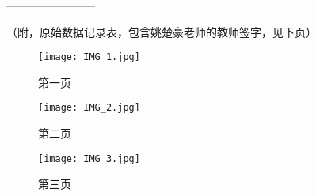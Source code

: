 \documentclass[11pt]{article}
\begin{document}
————————

（附，原始数据记录表，包含姚楚豪老师的教师签字，见下页）

\newpage

\begin{figure}[htbp]
    \centering
    \texttt{[image: IMG\_1.jpg]}
    \caption{第一页}
\end{figure}

\begin{figure}[htbp]
    \centering
    \texttt{[image: IMG\_2.jpg]}
    \caption{第二页}
\end{figure}

\begin{figure}[htbp]
    \centering
    \texttt{[image: IMG\_3.jpg]}
    \caption{第三页}
\end{figure}
\end{document}
